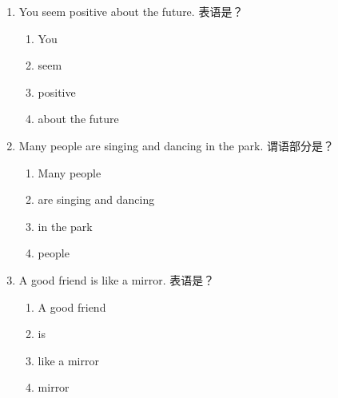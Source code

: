 \documentclass[11pt,a4paper]{ctexart}
\begin{document}
\begin{enumerate}[leftmargin=*,itemsep=4pt]
\begin{enumerate}[label=\Alph*.,leftmargin=2em,itemsep=1pt,topsep=2pt]
\item film
\end{enumerate}
\item You seem positive about the future. 表语是？
\begin{enumerate}[label=\Alph*.,leftmargin=2em,itemsep=1pt,topsep=2pt]
\item You
\item seem
\item positive
\item about the future
\end{enumerate}
\item Many people are singing and dancing in the park. 谓语部分是？
\begin{enumerate}[label=\Alph*.,leftmargin=2em,itemsep=1pt,topsep=2pt]
\item Many people
\item are singing and dancing
\item in the park
\item people
\end{enumerate}
\item A good friend is like a mirror. 表语是？
\begin{enumerate}[label=\Alph*.,leftmargin=2em,itemsep=1pt,topsep=2pt]
\item A good friend
\item is
\item like a mirror
\item mirror
\end{enumerate}
\end{enumerate}
\end{document}
